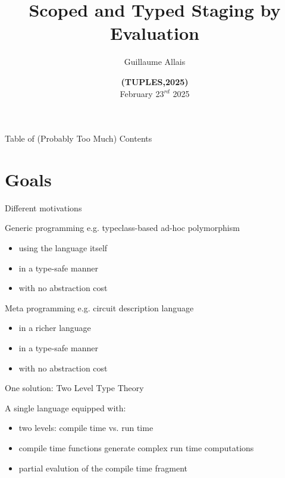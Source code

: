 \documentclass[aspectratio=169]{beamer}
\title{Scoped and Typed Staging by Evaluation}
\author{Guillaume Allais}
\institute{University of Strathclyde}
\date{{\bf {\color{TUPLEGRAY}(}{\color{TUPLEBLUE}TUPLES}{\color{TUPLEGRAY},}2025{\color{TUPLEGRAY})}} \\ February 23$^{rd}$ 2025}
\begin{document}
\begin{frame}
  \maketitle
\end{frame}

\begin{frame}{Table of (Probably Too Much) Contents}
  \tableofcontents
\end{frame}

\section{Goals}

\begin{frame}{Different motivations}

Generic programming e.g. typeclass-based ad-hoc polymorphism

\begin{itemize}
  \item<3-> using the language itself
  \item<2-> in a type-safe manner
  \item<2-> with no abstraction cost
\end{itemize}

\bigskip

Meta programming e.g. circuit description language

\begin{itemize}
  \item<4-> in a richer language
  \item<2-> in a type-safe manner
  \item<2-> with no abstraction cost
\end{itemize}

\end{frame}

\begin{frame}{One solution: Two Level Type Theory}

A single language equipped with:

\begin{itemize}
  \item<2-> two levels: compile time vs. run time
  \item<3-> compile time functions generate complex run time computations
  \item<4-> partial evalution of the compile time fragment
\end{itemize}

\vfill


\end{frame}
\end{document}
